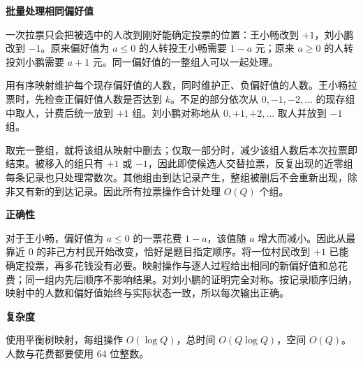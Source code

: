 \Legend
\textbf{批量处理相同偏好值}

一次拉票只会把被选中的人改到刚好能确定投票的位置：王小畅改到 $+1$，刘小鹏改到 $-1$。原来偏好值为 $a\le0$ 的人转投王小畅需要 $1-a$ 元；原来 $a\ge0$ 的人转投刘小鹏需要 $a+1$ 元。同一偏好值的一整组人可以一起处理。

用有序映射维护每个现存偏好值的人数，同时维护正、负偏好值的人数。王小畅拉票时，先检查正偏好值人数是否达到 $k$。不足的部分依次从 $0,-1,-2,\ldots$ 的现存组中取人，计费后统一放到 $+1$ 组。刘小鹏对称地从 $0,+1,+2,\ldots$ 取人并放到 $-1$ 组。

取完一整组，就将该组从映射中删去；仅取一部分时，减少该组人数后本次拉票即结束。被移入的组只有 $+1$ 或 $-1$，因此即使候选人交替拉票，反复出现的近零组每条记录也只处理常数次。其他组由到达记录产生，整组被删后不会重新出现，除非又有新的到达记录。因此所有拉票操作合计处理 $O(Q)$ 个组。

\textbf{正确性}

对于王小畅，偏好值为 $a\le0$ 的一票花费 $1-a$，该值随 $a$ 增大而减小。因此从最靠近 $0$ 的非己方村民开始改变，恰好是题目指定顺序。将一位村民改到 $+1$ 已能确定投票，再多花钱没有必要。映射操作与逐人过程给出相同的新偏好值和总花费；同一组内先后顺序不影响结果。对刘小鹏的证明完全对称。按记录顺序归纳，映射中的人数和偏好值始终与实际状态一致，所以每次输出正确。

\textbf{复杂度}

使用平衡树映射，每组操作 $O(\log Q)$，总时间 $O(Q\log Q)$，空间 $O(Q)$。人数与花费都要使用 $64$ 位整数。
